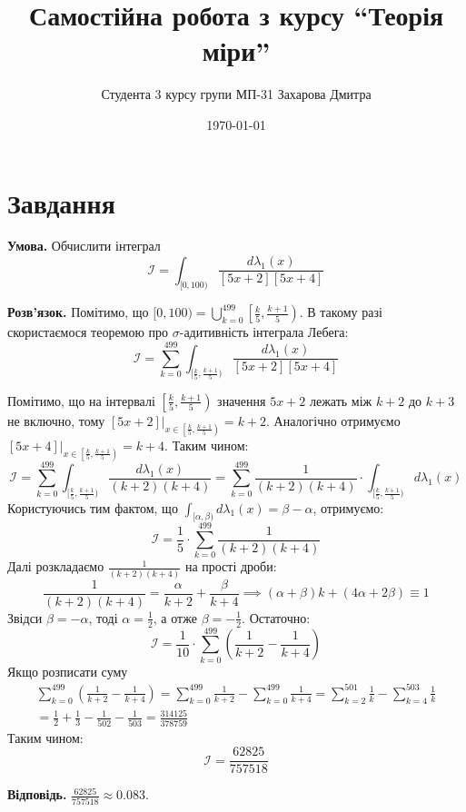 \documentclass[14pt]{extarticle}
\title{Самостійна робота з курсу ``Теорія міри''}
\author{Студента 3 курсу групи МП-31 Захарова Дмитра}
\date{\today}
\begin{document}
\maketitle

\section*{Завдання}
\textbf{Умова.} Обчислити інтеграл
\[
\mathcal{I} = \int_{[0,100)} \frac{d\lambda_1(x)}{[5x+2][5x+4]}
\]

\textbf{Розв'язок.} Помітимо, що $[0,100) = \bigcup_{k=0}^{499} \left[ \frac{k}{5}, \frac{k+1}{5} \right)$. В такому разі скористаємося теоремою про $\sigma$-адитивність інтеграла Лебега:
\[
\mathcal{I} = \sum_{k=0}^{499} \int_{[\frac{k}{5},\frac{k+1}{5})} \frac{d\lambda_1(x)}{[5x+2][5x+4]}
\]

Помітимо, що на інтервалі $\left[ \frac{k}{5}, \frac{k+1}{5} \right)$ значення $5x+2$ лежать між $k+2$ до $k+3$ не включно, тому $[5x+2]\Big|_{x \in \left[ \frac{k}{5}, \frac{k+1}{5} \right)} = k+2$. Аналогічно отримуємо $[5x+4]\Big|_{x \in \left[ \frac{k}{5}, \frac{k+1}{5} \right)} = k+4$. Таким чином:
\[
\mathcal{I} = \sum_{k=0}^{499}\int_{[\frac{k}{5},\frac{k+1}{5})} \frac{d\lambda_1(x)}{(k+2)(k+4)} = \sum_{k=0}^{499} \frac{1}{(k+2)(k+4)} \cdot \int_{[\frac{k}{5},\frac{k+1}{5})} d\lambda_1(x)
\]
Користуючись тим фактом, що $\int_{[\alpha,\beta)} d\lambda_1(x) = \beta - \alpha$, отримуємо:
\[
\mathcal{I} = \frac{1}{5} \cdot \sum_{k=0}^{499} \frac{1}{(k+2)(k+4)}
\]
Далі розкладаємо $\frac{1}{(k+2)(k+4)}$ на прості дроби:
\[
\frac{1}{(k+2)(k+4)} = \frac{\alpha}{k+2} + \frac{\beta}{k+4} \implies (\alpha+\beta)k + (4\alpha+2\beta) \equiv 1
\]
Звідси $\beta=-\alpha$, тоді $\alpha=\frac{1}{2}$, а отже $\beta=-\frac{1}{2}$. Остаточно:
\[
\mathcal{I} = \frac{1}{10} \cdot \sum_{k=0}^{499} \left(\frac{1}{k+2} - \frac{1}{k+4}\right)
\]
Якщо розписати суму
\begin{gather*}
\sum_{k=0}^{499}\left(\frac{1}{k+2} - \frac{1}{k+4}\right) = \sum_{k=0}^{499} \frac{1}{k+2} - \sum_{k=0}^{499} \frac{1}{k+4} = \sum_{k=2}^{501} \frac{1}{k} - \sum_{k=4}^{503} \frac{1}{k} \\
= \frac{1}{2} + \frac{1}{3} - \frac{1}{502} - \frac{1}{503} = \frac{314125}{378759}
\end{gather*}
Таким чином:
\[
\boxed{\mathcal{I} = \frac{62825}{757518}}
\]

\textbf{Відповідь.} $\frac{62825}{757518} \approx 0.083$.
\end{document}
